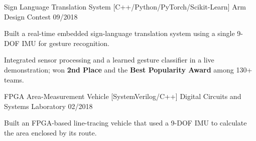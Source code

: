 \begin{cventries}
\vspace{1.5mm}
\cventry
  {Sign Language Translation System}
  {[C++/Python/PyTorch/Scikit-Learn]}
  {Arm Design Contest}
  {09/2018}
  {
    \vspace{-4.0mm}
    \begin{cvitems}
      \item {Built a real-time embedded sign-language translation system using a single 9-DOF IMU for gesture recognition.}
      \item {Integrated sensor processing and a learned gesture classifier in a live demonstration; won \textbf{2nd Place} and the \textbf{Best Popularity Award} among 130+ teams.}
    \end{cvitems}
  }

\cventry
  {FPGA Area-Measurement Vehicle}
  {[SystemVerilog/C++]}
  {Digital Circuits and Systems Laboratory}
  {02/2018}
  {
    \vspace{-4.0mm}
    \begin{cvitems}
      \item {Built an FPGA-based line-tracing vehicle that used a 9-DOF IMU to calculate the area enclosed by its route.}
    \end{cvitems}
  }

\end{cventries}
